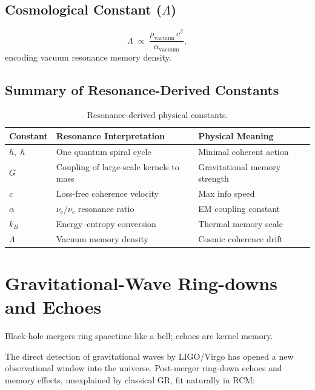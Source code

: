 \subsection*{Cosmological Constant ($\Lambda$)}
\[
\Lambda \;\propto\; \frac{\rho_{\text{vacuum}}\,c^2}{\alpha_{\text{vacuum}}},
\]
encoding vacuum resonance memory density.

\subsection{Summary of Resonance-Derived Constants}

\begin{table}[h]
\centering
\begin{tabular}{p{} p{} p{}}
\toprule
\textbf{Constant} & \textbf{Resonance Interpretation} & \textbf{Physical Meaning} \\ \midrule
$h,\;\hbar$ & One quantum spiral cycle & Minimal coherent action \\
$G$ & Coupling of large-scale kernels to mass & Gravitational memory strength \\
$c$ & Loss-free coherence velocity & Max info speed \\
$\alpha$ & $\nu_e/\nu_c$ resonance ratio & EM coupling constant \\
$k_B$ & Energy–entropy conversion & Thermal memory scale \\
$\Lambda$ & Vacuum memory density & Cosmic coherence drift \\
\bottomrule
\end{tabular}
\caption{Resonance-derived physical constants.}
\end{table}

\section{Gravitational-Wave Ring-downs and Echoes}

\begin{concept}
Black-hole mergers ring spacetime like a bell; echoes are kernel memory.
\end{concept}

The direct detection of gravitational waves by LIGO/Virgo has opened a new
observational window into the universe.  Post-merger ring-down echoes and
memory effects, unexplained by classical GR, fit naturally in RCM:

